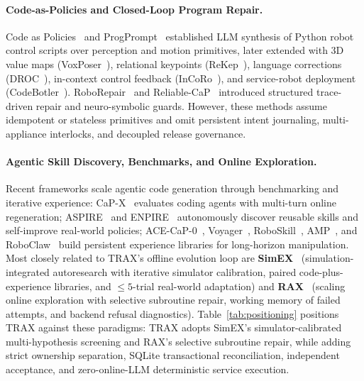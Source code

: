 \documentclass{trax}
\begin{document}
\paragraph{Code-as-Policies and Closed-Loop Program Repair.} Code as Policies~\cite{liang2022cap} and ProgPrompt~\cite{singh2022progprompt} established LLM synthesis of Python robot control scripts over perception and motion primitives, later extended with 3D value maps (VoxPoser~\cite{huang2023voxposer}), relational keypoints (ReKep~\cite{huang2024rekep}), language corrections (DROC~\cite{zha2023droc}), in-context control feedback (InCoRo~\cite{zhu2024incoro}), and service-robot deployment (CodeBotler~\cite{hu2023codebotler}). RoboRepair~\cite{schlesinger2024roborepair} and Reliable-CaP~\cite{ahn2025reliablecap} introduced structured trace-driven repair and neuro-symbolic guards. However, these methods assume idempotent or stateless primitives and omit persistent intent journaling, multi-appliance interlocks, and decoupled release governance.

\paragraph{Agentic Skill Discovery, Benchmarks, and Online Exploration.} Recent frameworks scale agentic code generation through benchmarking and iterative experience: CaP-X~\cite{fu2026capx} evaluates coding agents with multi-turn online regeneration; ASPIRE~\cite{lu2026aspire} and ENPIRE~\cite{enpire2026} autonomously discover reusable skills and self-improve real-world policies; ACE-CaP-0~\cite{ace2026}, Voyager~\cite{wang2023voyager}, RoboSkill~\cite{xie2026roboskill}, AMP~\cite{chen2026amp}, and RoboClaw~\cite{li2026roboclaw} build persistent experience libraries for long-horizon manipulation. Most closely related to TRAX's offline evolution loop are \textbf{SimEX}~\cite{hu2026simex} (simulation-integrated autoresearch with iterative simulator calibration, paired code-plus-experience libraries, and $\le 5$-trial real-world adaptation) and \textbf{RAX}~\cite{huang2026rax} (scaling online exploration with selective subroutine repair, working memory of failed attempts, and backend refusal diagnostics). Table~\ref{tab:positioning} positions TRAX against these paradigms: TRAX adopts SimEX's simulator-calibrated multi-hypothesis screening and RAX's selective subroutine repair, while adding strict ownership separation, SQLite transactional reconciliation, independent acceptance, and zero-online-LLM deterministic service execution.
\end{document}
